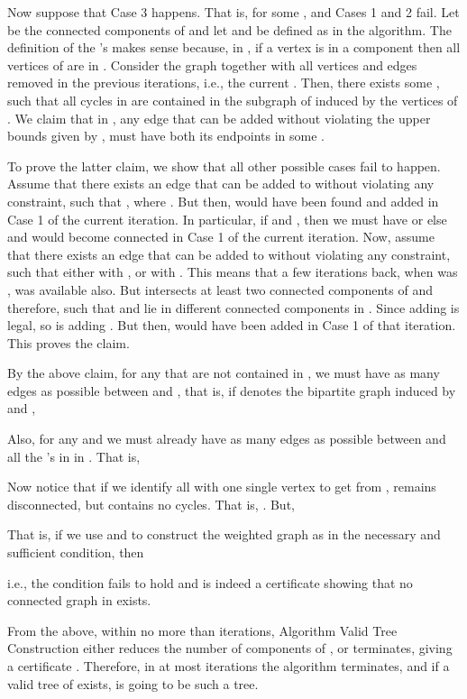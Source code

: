 \documentclass[12pt,a4paper]{article}
\theoremstyle{definition}
\theoremstyle{plain}
\newenvironment{prf}{\noindent {\bf Proof.}}{\begin{flushright}\vspace{-2em}\footnotesize\normalsize\end{flushright}\smallskip}
\begin{document}
\begin{prf}
Now suppose that Case 3 happens.
That is, for some ,  and Cases 1 and 2 fail.
Let  be the connected components of  
and let  and 
 be defined as in the algorithm. 
The definition of the
's makes sense because, in , 
if a vertex  is in a component
 then all vertices of  are in .
Consider the graph  together with 
all vertices and edges removed in the previous  iterations, 
i.e., the current . Then, there exists some ,
such that all cycles in 
are contained in the subgraph of  induced by the vertices of . 
We claim that
in , any edge that can be added without violating the upper bounds 
given by ,
must have both its endpoints in some .

To prove the latter claim, 
we show that all other possible cases fail to happen. 
Assume that there exists an edge  that 
can be added to  without violating any constraint, 
such that , where
. But then, 
 would have been found and added in Case 1 of the current iteration. 
In particular, if  
and , 
then we must have  
or else  and  would become connected
in Case 1 of the current iteration.
Now, assume
that there exists an edge  
that can be added to  without violating any constraint, 
such that either  
with , or 
 with .
This means that a few iterations back,
when  was ,  was available also. 
But  intersects at least two connected
components of  and therefore, 
 such that  and  lie in 
different connected components in . 
Since adding  is legal, so is adding . 
But then,
 would have been added in Case 1 of that iteration. This proves the claim.

By the above claim, for any  that are not contained 
in ,
we must have as many edges as possible between  and
, that is, if  
denotes the bipartite graph induced by  and ,
 
Also, for any  and 
 we must already have 
as many edges as possible between  and
all the 's in  in . That is,
 

Now notice that if we identify all  
with one single vertex to get  from
,  remains disconnected, 
but contains no cycles. That is, . 
But,


That is, if we use  and  
to construct the weighted graph 
 as in the necessary and sufficient condition, then 

i.e., the condition fails to hold and  is indeed a 
certificate showing that no connected graph in 
 exists.

From the above, within no more than  iterations, 
Algorithm Valid Tree Construction either reduces the 
number of components of , or terminates, 
giving a certificate . 
Therefore, in at most
 iterations the algorithm terminates, and if
a valid tree  of   exists, 
 is going to be such a tree.
\end{prf}
\end{document}

